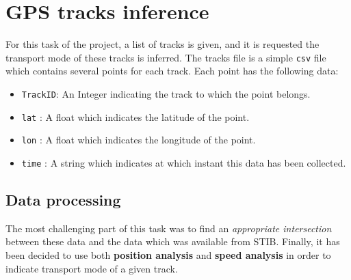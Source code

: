 \documentclass{article}
\begin{document}
\section{GPS tracks inference}
For this task of the project, a list of tracks is given, and it is requested the transport mode of these tracks is inferred. The tracks file is a simple \texttt{csv} file which contains several points for each track. Each point has the following data:
\begin{itemize}
     \item \texttt{TrackID}: An Integer indicating the track to which the point belongs.
     \item \texttt{lat} : A float which indicates the latitude of the point.
     \item \texttt{lon} : A float which indicates the longitude of the point.
     \item \texttt{time} : A string which indicates at which instant this data has been collected.
\end{itemize}

\subsection{Data processing}

The most challenging part of this task was to find an \textit{appropriate intersection} between these data and the data which was available from STIB. Finally, it has been decided to use both \textbf{position analysis} and \textbf{speed analysis} in order to indicate transport mode of a given track.
\end{document}
